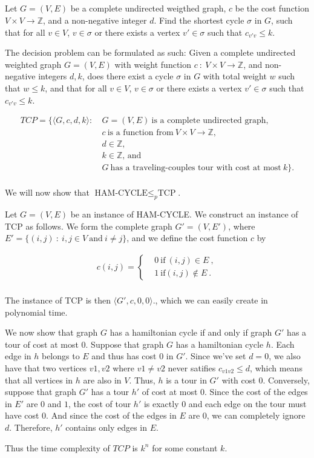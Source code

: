 \subsection{}

Let $G = (V,E)$ be a complete undirected weigthed graph, $c$ be the
cost function $V \times V \to \mathbb{Z}$, and a non-negative integer
$d$. Find the shortest cycle $\sigma$ in $G$, such that for all $v \in
V$, $v \in \sigma$ or there exists a vertex $v' \in \sigma$ such that
$c_{v'v} \leq k$.

The decision problem can be formulated as such: Given a complete
undirected weighted graph $G=(V,E)$ with weight function $c ~ : ~ V
\times V \to \mathbb{Z}$, and non-negative integers $d,k$, does there
exist a cycle $\sigma$ in $G$ with total weight $w$ such that $w \leq
k$, and that for all $v \in V$, $v \in \sigma$ or there exists a
vertex $v' \in \sigma$ such that $c_{v'v} \leq k$.

\begin{align*}
  TCP = \{ \langle G, c, d, k \rangle : ~ & G = (V,E) ~ \text{is a complete
    undirected graph}, \\
  & c ~ \text{is a function from} ~ V \times V \to \mathbb{Z}, \\
  & d \in \mathbb{Z}, \\ 
  & k \in \mathbb{Z} \textrm{, and} \\
  & G ~\text{has a traveling-couples tour with cost at most} ~ k\} .\\
\end{align*}

We will now show that $\text{HAM-CYCLE} \leq_p \text{TCP}$.

Let $G = (V,E)$ be an instance of HAM-CYCLE. We construct an instance
of TCP as follows. We form the complete graph $G' = (V,E')$, where $E'
= \{(i,j)~:~i,j\in V ~ \text{and}~ i \neq j \}$, and we define the
cost function $c$ by

\begin{align*}
  c(i,j) = \begin{cases} & 0 ~ \text{if} ~ (i, j) \in E~ , \\
    & 1 ~ \text{if} (i, j) \notin E~.\end{cases}\\
\end{align*}

The instance of TCP is then $\langle G', c, 0, 0 \rangle$., which we
can easily create in polynomial time.

We now show that graph $G$ has a hamiltonian cycle if and only if
graph $G'$ has a tour of cost at most $0$. Suppose that graph $G$ has
a hamiltonian cycle $h$. Each edge in $h$ belongs to $E$ and thus has
cost $0$ in $G'$. Since we've set $d=0$, we also have that two
vertices $v1, v2$ where $v1 \neq v2$ never satifies $c_{v1v2} \leq d$,
which means that all vertices in $h$ are also in $V$. Thus, $h$ is a
tour in $G'$ with cost $0$. Conversely, suppose that graph $G'$ has a
tour $h'$ of cost at most $0$. Since the cost of the edges in $E'$ are
$0$ and $1$, the cost of tour $h'$ is exactly $0$ and each edge on the
tour must have cost 0. And since the cost of the edges in $E$ are $0$,
we can completely ignore $d$. Therefore, $h'$ contains only edges in
$E$.

Thus the time complexity of $TCP$ is $k^n$ for some constant $k$.
